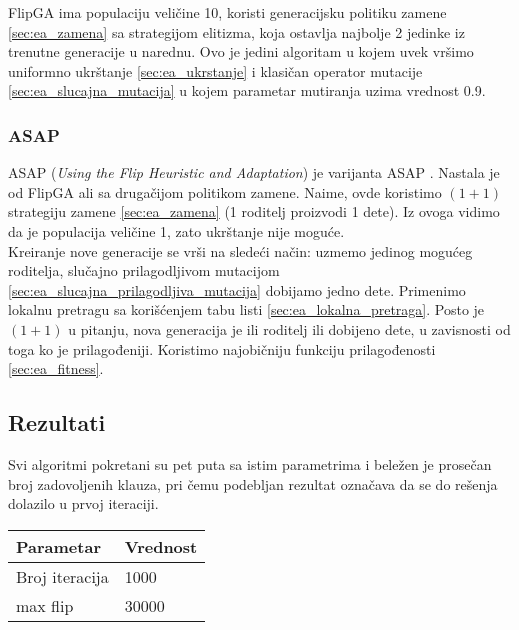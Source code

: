 \documentclass{article}
\begin{document}
FlipGA ima populaciju veličine 10, koristi generacijsku politiku zamene \ref{sec:ea_zamena} sa strategijom elitizma, koja ostavlja najbolje 2 jedinke iz trenutne generacije u narednu.	Ovo je jedini algoritam u kojem uvek vršimo uniformno ukrštanje \ref{sec:ea_ukrstanje} i klasičan operator mutacije \ref{sec:ea_slucajna_mutacija} u kojem parametar mutiranja uzima vrednost 0.9.
 
\subsubsection{ASAP}
\label{sec:ea_asap}
ASAP (\textit{Using the Flip Heuristic and Adaptation}) je varijanta ASAP \cite{ea_with_table}. Nastala je od FlipGA ali sa drugačijom politikom zamene. Naime, ovde koristimo
$(1+1)$ strategiju zamene \ref{sec:ea_zamena} (1 roditelj proizvodi 1 dete). Iz ovoga vidimo da je populacija veličine 1, zato ukrštanje nije moguće. \\

Kreiranje nove generacije se vrši na sledeći način: uzmemo jedinog mogućeg roditelja, slučajno prilagodljivom mutacijom \ref{sec:ea_slucajna_prilagodljiva_mutacija} dobijamo jedno dete. Primenimo lokalnu pretragu sa korišćenjem tabu listi \ref{sec:ea_lokalna_pretraga}. Posto je $(1+1)$ u pitanju, nova generacija je ili roditelj ili dobijeno dete, u zavisnosti od toga ko je prilagođeniji. Koristimo najobičniju funkciju prilagođenosti \ref{sec:ea_fitness}.

\subsection{Rezultati}
\label{sec:ea_rezultati}
Svi algoritmi pokretani su pet puta sa istim parametrima i beležen je prosečan broj zadovoljenih klauza, pri čemu podebljan rezultat označava da se do rešenja dolazilo u prvoj iteraciji. \\

\begin{table}[h!]
\centering
{}\label{tab:ea_parametri} 
\begin{tabular}{ |p{3cm}|p{2cm}| }
 \hline
 Parametar 	& Vrednost \\ \hline
 Broj iteracija & 1000 \\ \hline
 max flip & 30000 \\  \hline
\end{tabular}
\end{table}
\end{document}
